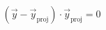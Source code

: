 \documentclass[preview]{standalone}
\begin{document}
\begin{align*}
(\vec{y} - \vec{y}_{\text{proj}}) \cdot \vec{y}_{\text{proj}} = 0
\end{align*}
\end{document}
